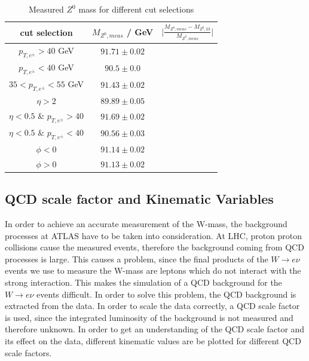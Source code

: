     \begin{table}[H]
        \centering
        \begin{tabular}{ccc}
            \toprule
            \toprule
            cut selection & $M_{Z^0,meas}$ / GeV & $\bigl| \frac{M_{Z^0,meas}- M_{Z^0,lit}}{M_{Z^0,meas}} \bigr|$ \\
            \midrule
            $p_{T,e^{\pm}} > 40$ GeV & $91.71 \pm 0.02$ & \\
            $p_{T,e^{\pm}} < 40$ GeV & $90.5 \pm 0.0$ & \\
            $35 < p_{T,e^{\pm}} < 55$ GeV & $91.43 \pm 0.02$ & \\
            $\eta > 2$ & $89.89 \pm 0.05$ & \\
            $\eta < 0.5$ \& $p_{T,e^{\pm}} > 40$ & $91.69 \pm 0.02$ & \\
            $\eta < 0.5$ \& $p_{T,e^{\pm}} < 40$ & $90.56 \pm 0.03$ & \\
            $\phi < 0$ & $91.14 \pm 0.02$ & \\
            $\phi > 0$ & $91.13 \pm 0.02$ & \\
            \bottomrule
            \bottomrule
        \end{tabular}
        \caption{Measured $Z^0$ mass for different cut selections}
        \label{tab:z-masses}
    \end{table}


\subsection{QCD scale factor and Kinematic Variables}
    \label{sec:qcd_factor/variables}
    In order to achieve an accurate measurement of the W-mass, the background processes at ATLAS have to be taken into consideration.
    At LHC, proton proton collisions cause the measured events, therefore the background coming from QCD processes is large. This causes a problem,
    since the final products of the $W \rightarrow e\nu$ events we use to measure the W-mass are leptons which do not interact with the strong interaction.
    This makes the simulation of a QCD background for the $W \rightarrow e\nu$ events difficult. In order to solve this problem, the QCD background is extracted
    from the data. In order to scale the data correctly, a QCD scale factor is used, since the integrated luminosity of the background is not measured and therefore
    unknown. In order to get an understanding of the QCD scale factor and its effect on the data, different kinematic values are be plotted for different 
    QCD scale factors.

